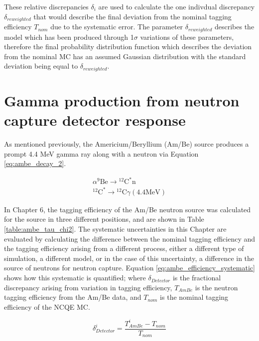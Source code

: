 These relative discrepancies $\delta_{i}$ are used to calculate the one indivdual discrepancy $\delta_{reweighted}$ that would describe the final deviation from the nominal tagging efficiency $T_{nom}$ due to the systematic error. The parameter $\delta_{reweighted}$ describes the model which has been produced through 1$\sigma$ variations of these parameters, therefore the final probability distribution function which describes the deviation from the nominal MC has an assumed Gaussian distribution with the standard deviation being equal to $\delta_{reweighted}$. 



\section{Gamma production from neutron capture detector response}

As mentioned previously, the Americium/Beryllium (Am/Be) source produces a prompt 4.4 MeV gamma ray along with a neutron via Equation \ref{eq:ambe_decay_2}. 

\begin{equation}
    \begin{gathered}
    \alpha{ }^9 \mathrm{Be} \longrightarrow{ }^{12} \mathrm{C}^* \mathrm{n} \\
    { }^{12} \mathrm{C}^* \longrightarrow{ }^{12} \mathrm{C} \gamma(4.4 \mathrm{MeV})
    \end{gathered}
\label{eq:ambe_decay_2}
\end{equation}

In Chapter 6, the tagging efficiency of the Am/Be neutron source was calculated for the source in three different positions, and are shown in Table \ref{table:ambe_tau_chi2}. The systematic uncertainties in this Chapter are evaluated by calculating the difference between the nominal tagging efficiency and the tagging efficiency arising from a different process, either a different type of simulation, a different model, or in the case of this uncertainty, a difference in the source of neutrons for neutron capture. Equation \ref{eq:ambe_efficiency_systematic} shows how this systematic is quantified; where $\delta_{Detector}$ is the fractional discrepancy arising from variation in tagging efficiency, $T_{AmBe}$ is the neutron tagging efficiency from the Am/Be data, and $T_{nom}$ is the nominal tagging efficiency of the NCQE MC. 

\begin{equation}
\delta_{Detector}^{i}=\frac{T_{AmBe}^{i}-T_{n o m}}{T_{n o m}}
\label{eq:ambe_efficiency_systematic}
\end{equation}

